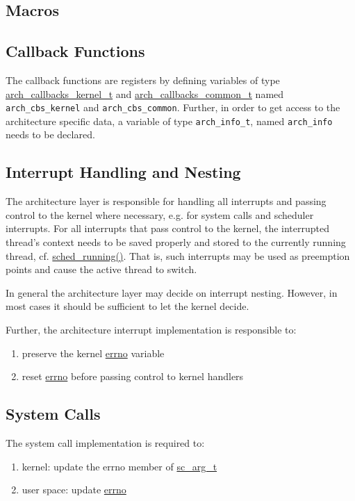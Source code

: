 	\subsection{Macros}

	\subsection{Callback Functions}
		The callback functions are registers by defining variables of type \hyperref[structarch__callbacks__kernel__t]{arch\_callbacks\_kernel\_t} and \hyperref[structarch__callbacks__common__t]{arch\_callbacks\_common\_t} named \lstinline{arch_cbs_kernel} and \lstinline{arch_cbs_common}. Further, in order to get access to the architecture specific data, a variable of type \lstinline{arch_info_t}, named \lstinline{arch_info} needs to be declared.

	\subsection{Interrupt Handling and Nesting}
		The architecture layer is responsible for handling all interrupts and passing control to the kernel where necessary, e.g. for system calls and scheduler interrupts. For all interrupts that pass control to the kernel, the interrupted thread's context needs to be saved properly and stored to the currently running thread, cf. \hyperref[kernel_2sched_8c_a34a33397e7197f803feffb423ce6717a]{sched\_running()}. That is, such interrupts may be used as preemption points and cause the active thread to switch.

		In general the architecture layer may decide on interrupt nesting. However, in most cases it should be sufficient to let the kernel decide.

		Further, the architecture interrupt implementation is responsible to:
		\begin{enumerate}
			\item preserve the kernel \hyperref[errno_8h_ad65a8842cc674e3ddf69355898c0ecbf]{errno} variable
			\item reset \hyperref[errno_8h_ad65a8842cc674e3ddf69355898c0ecbf]{errno} before passing control to kernel handlers
		\end{enumerate}

	\subsection{System Calls}
		The system call implementation is required to:
		\begin{enumerate}
			\item kernel: update the errno member of \hyperref[sys_2syscall_8h_structsc__arg__t]{sc\_arg\_t}
			\item user space: update \hyperref[errno_8h_ad65a8842cc674e3ddf69355898c0ecbf]{errno}
		\end{enumerate}

